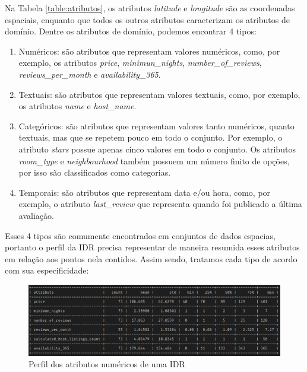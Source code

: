 Na Tabela \ref{table:atributos}, os atributos {\em latitude} e {\em longitude} são as coordenadas espaciais, enquanto que todos os outros atributos caracterizam os atributos de domínio. Dentre os atributos de domínio, podemos encontrar 4 tipos:

\begin{enumerate}
	\item Numéricos: são atributos que representam valores numéricos, como, por exemplo, os atributos {\em price}, {\em minimun\_nights}, {\em number\_of\_reviews}, {\em reviews\_per\_month} e {\em availability\_365}.
	\item Textuais: são atributos que representam valores textuais, como, por exemplo, os atributos {\em name} e {\em host\_name}.
	\item Categóricos: são atributos que representam valores tanto numéricos, quanto textuais, mas que se repetem pouco em todo o conjunto. Por exemplo, o atributo {\em stars} possue apenas cinco valores em todo o conjunto. Os atributos {\em room\_type} e {\em neighbourhood} também possuem um número finito de opções, por isso são classificados como categorias.
	\item Temporais: são atributos que representam data e/ou hora, como, por exemplo, o atributo {\em last\_review} que representa quando foi publicado a última avaliação.
\end{enumerate}

Esses 4 tipos são comumente encontrados em conjuntos de dados espacias, portanto o perfil da IDR precisa representar de maneira resumida esses atributos em relação aos pontos nela contidos. Assim sendo, tratamos cada tipo de acordo com sua especificidade:


\begin{figure}[t]
	\centering
	\includegraphics[width=\columnwidth]{imagens/perfil-numericos}
	\caption{Perfil dos atributos numéricos de uma IDR}
	\label{fig:perfil-numericos}
	\vspace{-10pt}
\end{figure}

